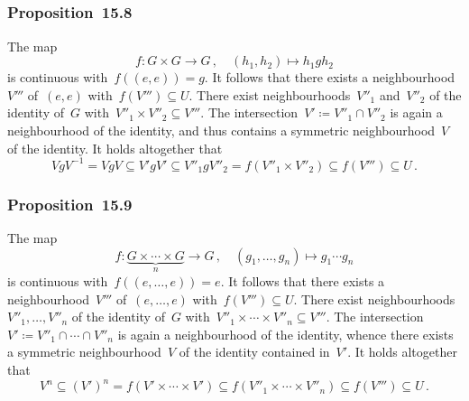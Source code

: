 \subsection{}



\subsubsection*{Proposition~15.8}

The map
\[
	f
	\colon
	G × G \to G \,,
	\quad
	(h_1, h_2) \mapsto h_1 g h_2
\]
is continuous with~$f( (e, e) ) = g$.
It follows that there exists a neighbourhood~$V'''$ of~$(e, e)$ with~$f(V''') ⊆ U$.
There exist neighbourhoods~$V''_1$ and~$V''_2$ of the identity of~$G$ with~$V''_1 × V''_2 ⊆ V'''$.
The intersection~$V' ≔ V''_1 ∩ V''_2$ is again a neighbourhood of the identity, and thus contains a symmetric neighbourhood~$V$ of the identity.
It holds altogether that
\[
	V g V^{-1}
	=
	V g V
	⊆
	V' g V'
	⊆
	V''_1 g V''_2
	=
	f(V''_1 × V''_2)
	⊆
	f(V''')
	⊆
	U \,.
\]



\subsubsection*{Proposition~15.9}

The map
\[
	f
	\colon
	\underbrace{ G × \dotsb × G }_n \to G \,,
	\quad
	(g_1, \dotsc, g_n) \mapsto g_1 \dotsm g_n
\]
is continuous with~$f((e, \dotsc, e)) = e$.
It follows that there exists a neighbourhood~$V'''$ of~$(e, \dotsc, e)$ with~$f(V''') ⊆ U$.
There exist neighbourhoods~$V''_1, \dotsc, V''_n$ of the identity of~$G$ with~$V''_1 × \dotsb × V''_n ⊆ V'''$.
The intersection~$V' ≔ V''_1 ∩ \dotsb ∩ V''_n$ is again a neighbourhood of the identity, whence there exists a symmetric neighbourhood~$V$ of the identity contained in~$V'$.
It holds altogether that
\[
	V^n
	⊆
	(V')^n
	=
	f(V' × \dotsb × V')
	⊆
	f(V''_1 × \dotsb × V''_n)
	⊆
	f(V''')
	⊆
	U \,.
\]
